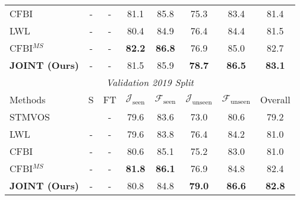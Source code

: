 \documentclass[10pt,twocolumn,letterpaper]{article}
\begin{document}
\begin{table}[htbp]
\begin{center}
{\begin{tabular*}{\hsize}{@{}@{\extracolsep{\fill}}lccccccc@{}}
			CFBI  \cite{CFBI2020A} & - & - & 81.1 & 85.8 & 75.3 & 83.4 & 81.4\\
			LWL  \cite{Goutam2020A}  & - & - &  80.4 & 84.9 & 76.4 & 84.4 & 81.5\\
			CFBI$^{MS}$  \cite{CFBI2020A} & - & - & \textbf{82.2} & \textbf{86.8} & 76.9 & 85.0 & 82.7\\
\textbf{JOINT (Ours)} & - & - & 81.5 & 85.9 & \textbf{78.7} & \textbf{86.5}& \textbf{83.1}\\
			\midrule[1.0pt]
\multicolumn{8}{c}{\emph{Validation 2019 Split}} \\
			\midrule
			Methods & S & FT & $\mathcal{J}_{\text{seen}}$ & $\mathcal{F}_{\text{seen}}$ & $\mathcal{J}_{\text{unseen}}$ & $\mathcal{F}_{\text{unseen}}$ & Overall\\
			\midrule
			STMVOS  \cite{Seoung2019A} & \checkmark & - & 79.6 & 83.6 & 73.0 & 80.6 & 79.2\\
			\midrule
			LWL  \cite{Goutam2020A} & - & - & 79.6 & 83.8 & 76.4 & 84.2 & 81.0\\
			CFBI  \cite{CFBI2020A} & - & - & 80.6 & 85.1 & 75.2 & 83.0 & 81.0\\
			CFBI$^{MS}$  \cite{CFBI2020A} & - & - & \textbf{81.8} & \textbf{86.1} & 76.9 & 84.8 & 82.4\\
\textbf{JOINT (Ours)} & - & - & 80.8 & 84.8 & \textbf{79.0} & \textbf{86.6} & \textbf{82.8}\\
			\bottomrule[1.0pt]
		\end{tabular*}
		}
	\end{center}
	\label{table:yt-val}
	\vspace{-2.5em}
\end{table}
\end{document}
